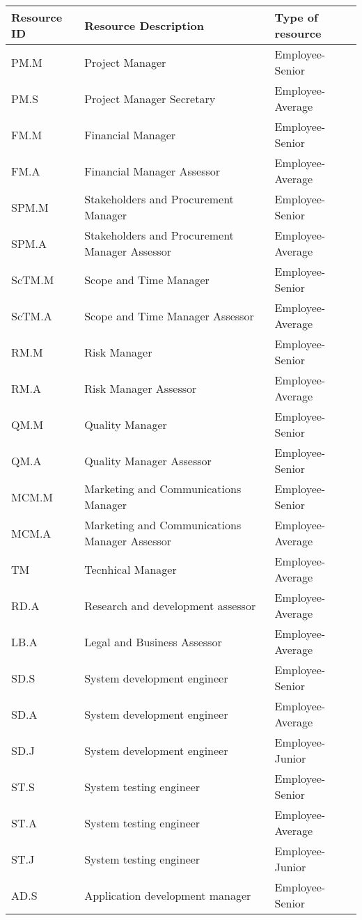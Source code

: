 \begin{longtable}[H]{l l l}
		
	\toprule[2pt]
	
	\textbf{Resource ID} & \textbf{Resource Description} & \textbf{Type of resource} \\
	
	\midrule[1.5pt] 
	\endhead
		
	PM.M&Project Manager&Employee-Senior\\
	PM.S&Project Manager Secretary&Employee-Average\\
	FM.M&Financial Manager&Employee-Senior\\
	FM.A&Financial Manager Assessor&Employee-Average\\
	SPM.M&Stakeholders and Procurement Manager&Employee-Senior\\
	SPM.A&Stakeholders and Procurement Manager Assessor&Employee-Average\\
	ScTM.M&Scope and Time Manager&Employee-Senior\\
	ScTM.A&Scope and Time Manager Assessor&Employee-Average\\
	RM.M&Risk Manager&Employee-Senior\\
	RM.A&Risk Manager Assessor&Employee-Average\\
	QM.M&Quality Manager&Employee-Senior\\
	QM.A&Quality Manager Assessor&Employee-Senior\\
	MCM.M&Marketing and Communications Manager&Employee-Senior\\
	MCM.A&Marketing and Communications Manager Assessor&Employee-Average\\
	TM&Tecnhical Manager&Employee-Average\\
	RD.A&Research and development assessor&Employee-Average\\
	LB.A&Legal and Business Assessor&Employee-Average\\
	SD.S&System development engineer&Employee-Senior\\
	SD.A&System development engineer&Employee-Average\\
	SD.J&System development engineer&Employee-Junior\\
	ST.S&System testing engineer&Employee-Senior\\
	ST.A&System testing engineer&Employee-Average\\
	ST.J&System testing engineer&Employee-Junior\\
	AD.S&Application development manager&Employee-Senior\\

\end{longtable}
